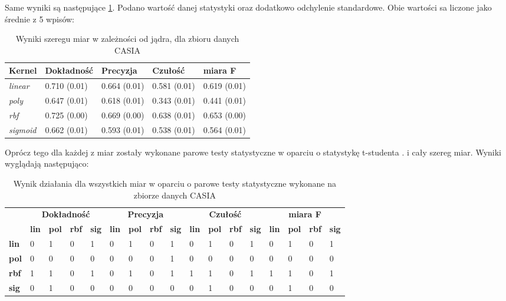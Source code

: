 Same wyniki są następujące \ref{tab:result}. Podano wartość danej statystyki oraz dodatkowo odchylenie standardowe. Obie wartości sa liczone jako średnie z 5 wpisów:
\begin{table}[h!]
	\centering
	\begin{tabular}{|l|l|l|l|l|}
		\hline
		\textbf{Kernel} & \textbf{Dokładność} & \textbf{Precyzja} & \textbf{Czułość} & \textbf{miara F} \\ \hline
		\textit{linear}  & 0.710 (0.01) & 0.664 (0.01) & 0.581 (0.01) & 0.619 (0.01) \\ \hline
		\textit{poly}    & 0.647 (0.01) & 0.618 (0.01) & 0.343 (0.01) & 0.441 (0.01) \\ \hline
		\textit{rbf}     & 0.725 (0.00) & 0.669 (0.00) & 0.638 (0.01) & 0.653 (0.00) \\ \hline
		\textit{sigmoid} & 0.662 (0.01) & 0.593 (0.01) & 0.538 (0.01) & 0.564 (0.01) \\ \hline
	\end{tabular}
	\caption{Wyniki szeregu miar w zależności od jądra, dla zbioru danych CASIA}
	\label{tab:result}
\end{table}

Oprócz tego dla każdej z miar zostały wykonane parowe testy statystyczne w oparciu o statystykę t-studenta \cite{stata}. i cały szereg miar.  Wyniki wyglądają następująco:

\begin{table}[h!]
	\centering
	\begin{tabular}{l|l|l|l|l|l|l|l|l|l|l|l|l|l|l|l|l|}
		\cline{2-17}
		&
		\multicolumn{4}{c|}{\textbf{Dokładność}} &
		\multicolumn{4}{c|}{\textbf{Precyzja}} &
		\multicolumn{4}{c|}{\textbf{Czułość}} &
		\multicolumn{4}{c|}{\textbf{miara F}} \\ \cline{2-17} 
		\textbf{} &
		\textbf{lin} &
		\textbf{pol} &
		\textbf{rbf} &
		\textbf{sig} &
		\textbf{lin} &
		\textbf{pol} &
		\textbf{rbf} &
		\textbf{sig} &
		\textbf{lin} &
		\textbf{pol} &
		\textbf{rbf} &
		\textbf{sig} &
		\textbf{lin} &
		\textbf{pol} &
		\textbf{rbf} &
		\textbf{sig} \\ \hline
		\multicolumn{1}{|l|}{\textbf{lin}}  & 0 & 1 & 0 & 1 & 0 & 1 & 0 & 1 & 0 & 1 & 0 & 1 & 0 & 1 & 0 & 1 \\ \hline
		\multicolumn{1}{|l|}{\textbf{pol}}    & 0 & 0 & 0 & 0 & 0 & 0 & 0 & 1 & 0 & 0 & 0 & 0 & 0 & 0 & 0 & 0 \\ \hline
		\multicolumn{1}{|l|}{\textbf{rbf}}     & 1 & 1 & 0 & 1 & 0 & 1 & 0 & 1 & 1 & 1 & 0 & 1 & 1 & 1 & 0 & 1 \\ \hline
		\multicolumn{1}{|l|}{\textbf{sig}} & 0 & 1 & 0 & 0 & 0 & 0 & 0 & 0 & 0 & 1 & 0 & 0 & 0 & 1 & 0 & 0 \\ \hline
	\end{tabular}
	\caption{Wynik działania dla wszystkich miar w oparciu o parowe testy statystyczne wykonane na zbiorze danych CASIA }
	\label{tab:result_c}
\end{table}


